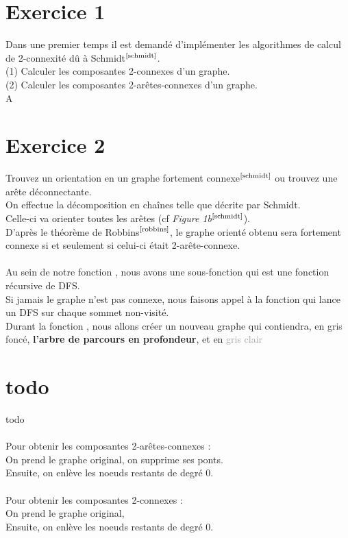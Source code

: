 \documentclass{article}      %
\begin{document}
\section{Exercice 1}
\textcolor{exogris}{
Dans une premier temps il est demandé d’implémenter les algorithmes de calcul de 2-connexité dû à Schmidt$^\text{\cite{schmidt}}$.
\\(1) Calculer les composantes 2-connexes d’un graphe.
\\(2) Calculer les composantes 2-arêtes-connexes d’un graphe.
}
\\A



\section{Exercice 2}
\textcolor{exogris}{
Trouvez un orientation en un graphe fortement connexe$^\text{\cite{schmidt}}$ ou trouvez une arête déconnectante.
}
\\On effectue la décomposition en chaînes telle que décrite par Schmidt.
\\Celle-ci va orienter toutes les arêtes (cf \textit{Figure 1b}$^\text{\cite{schmidt}}$).
\\D'après le théorème de Robbins$^\text{\cite{robbins}}$, le graphe orienté obtenu sera fortement connexe si et seulement si celui-ci était 2-arête-connexe.
\\\\Au sein de notre fonction , nous avons une sous-fonction  qui est une fonction récursive de DFS.
\\Si jamais le graphe n'est pas connexe, nous faisons appel à la fonction  qui lance un DFS sur chaque sommet non-visité.
\\Durant la fonction , nous allons créer un nouveau graphe qui contiendra, en 
\textcolor[HTML]{333333}{gris foncé}, \textbf{l'arbre de parcours en profondeur}, et en \textcolor[HTML]{a0a0a0}{gris clair}




\section{todo}
todo
\\\\Pour obtenir les composantes 2-arêtes-connexes :
\\On prend le graphe original, on supprime ses ponts.
\\Ensuite, on enlève les noeuds restants de degré 0.
%
\\\\Pour obtenir les composantes 2-connexes :
\\On prend le graphe original, 
\\Ensuite, on enlève les noeuds restants de degré 0.
\end{document}

